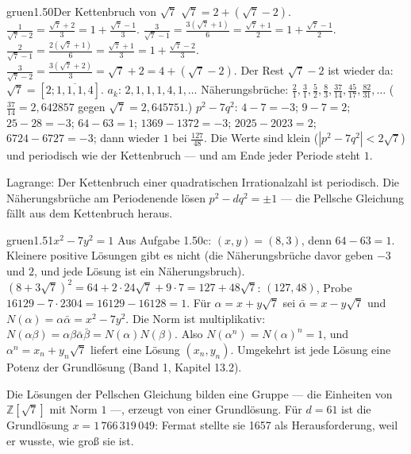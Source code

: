 \begin{loesungkarte}{gruen}{1.50}{Der Kettenbruch von $\sqrt7$}
$\sqrt7 = 2 + (\sqrt7 - 2)$. $\frac1{\sqrt7 - 2} = \frac{\sqrt7 + 2}{3} = 1 + \frac{\sqrt7 - 1}3$. $\frac3{\sqrt7 - 1} = \frac{3(\sqrt7 + 1)}6 = \frac{\sqrt7 + 1}2 = 1 + \frac{\sqrt7 - 1}2$. $\frac2{\sqrt7 - 1} = \frac{2(\sqrt7 + 1)}6 = \frac{\sqrt7 + 1}3 = 1 + \frac{\sqrt7 - 2}3$. $\frac3{\sqrt7 - 2} = \frac{3(\sqrt7 + 2)}3 = \sqrt7 + 2 = 4 + (\sqrt7 - 2)$. Der Rest $\sqrt7 - 2$ ist wieder da: $\sqrt7 = [2; \overline{1, 1, 1, 4}]$.
$a_k$: $2, 1, 1, 1, 4, 1, \dots$ Näherungsbrüche: $\frac21, \frac31, \frac52, \frac83, \frac{37}{14}, \frac{45}{17}, \frac{82}{31}, \dots$ ($\frac{37}{14} = 2{,}642857$ gegen $\sqrt7 = 2{,}645751$.)
$p^{2} - 7q^{2}$: $4 - 7 = -3$; $9 - 7 = 2$; $25 - 28 = -3$; $64 - 63 = 1$; $1369 - 1372 = -3$; $2025 - 2023 = 2$; $6724 - 6727 = -3$; dann wieder $1$ bei $\frac{127}{48}$. Die Werte sind klein ($|p^{2} - 7q^{2}| < 2\sqrt7$) und periodisch wie der Kettenbruch --- und am Ende jeder Periode steht $1$.
\begin{mitnehmen}\kastentext
Lagrange: Der Kettenbruch einer quadratischen Irrationalzahl ist periodisch. Die Näherungsbrüche am Periodenende lösen $p^{2} - dq^{2} = \pm1$ --- die Pellsche Gleichung fällt aus dem Kettenbruch heraus.
\end{mitnehmen}
\end{loesungkarte}

\begin{loesungkarte}{gruen}{1.51}{$x^{2} - 7y^{2} = 1$}
Aus Aufgabe 1.50c: $(x, y) = (8, 3)$, denn $64 - 63 = 1$. Kleinere positive Lösungen gibt es nicht (die Näherungsbrüche davor geben $-3$ und $2$, und jede Lösung ist ein Näherungsbruch).
$(8 + 3\sqrt7)^{2} = 64 + 2\cdot24\sqrt7 + 9\cdot7 = 127 + 48\sqrt7$: $(127, 48)$, Probe $16129 - 7\cdot2304 = 16129 - 16128 = 1$. \checkmark
{}
Für $\alpha = x + y\sqrt7$ sei $\bar\alpha = x - y\sqrt7$ und $N(\alpha) = \alpha\bar\alpha = x^{2} - 7y^{2}$. Die Norm ist multiplikativ: $N(\alpha\beta) = \alpha\beta\bar\alpha\bar\beta = N(\alpha)N(\beta)$. Also $N(\alpha^{n}) = N(\alpha)^{n} = 1$, und $\alpha^{n} = x_n + y_n\sqrt7$ liefert eine Lösung $(x_n, y_n)$. Umgekehrt ist jede Lösung eine Potenz der Grundlösung (Band 1, Kapitel 13.2).
\begin{mitnehmen}\kastentext
Die Lösungen der Pellschen Gleichung bilden eine Gruppe --- die Einheiten von $\mathbb Z[\sqrt7]$ mit Norm $1$ ---, erzeugt von einer Grundlösung. Für $d = 61$ ist die Grundlösung $x = 1\,766\,319\,049$: Fermat stellte sie 1657 als Herausforderung, weil er wusste, wie groß sie ist.
\end{mitnehmen}
\end{loesungkarte}


